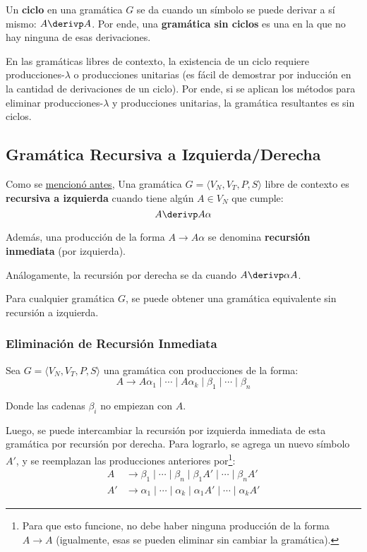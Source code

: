 Un \textbf{ciclo} en una gramática $G$ se da cuando un símbolo se puede derivar a sí mismo: $A \derivp A$. Por ende, una \textbf{gramática sin ciclos} es una en la que no hay ninguna de esas derivaciones.

En las gramáticas libres de contexto, la existencia de un ciclo requiere producciones-$\lambda$ o producciones unitarias (es fácil de demostrar por inducción en la cantidad de derivaciones de un ciclo). Por ende, si se aplican los métodos para eliminar producciones-$\lambda$ y producciones unitarias, la gramática resultantes es sin ciclos.

\subsection{Gramática Recursiva a Izquierda/Derecha}

Como se \hyperref[recursiva-a-izquierda-cota]{mencionó antes}, Una gramática $G = \langle V_N, V_T, P, S \rangle$ libre de contexto es \textbf{recursiva a izquierda} cuando tiene algún $A \in V_N$ que cumple:
$$
    A \derivp A \alpha
$$

Además, una producción de la forma $A \to A \alpha$ se denomina \textbf{recursión inmediata} (por izquierda).

Análogamente, la recursión por derecha se da cuando $A \derivp \alpha A$.

Para cualquier gramática $G$, se puede obtener una gramática equivalente sin recursión a izquierda.

\subsubsection{Eliminación de Recursión Inmediata}

Sea $G = \langle V_N, V_T, P, S \rangle$ una gramática con producciones de la forma:
$$
    A \to A \alpha_1 \mid \cdots \mid A \alpha_k \mid \beta_1 \mid \cdots \mid \beta_n
$$

Donde las cadenas $\beta_i$ no empiezan con $A$.

Luego, se puede intercambiar la recursión por izquierda inmediata de esta gramática por recursión por derecha. Para lograrlo, se agrega un nuevo símbolo $A'$, y se reemplazan las producciones anteriores por\footnote{Para que esto funcione, no debe haber ninguna producción de la forma $A \to A$ (igualmente, esas se pueden eliminar sin cambiar la gramática).}:
$$
\begin{aligned}
    A & \to \beta_1 \mid \cdots \mid \beta_n \mid \beta_1 A' \mid \cdots \mid \beta_n A' \\
    A' & \to \alpha_1 \mid \cdots \mid \alpha_k \mid \alpha_1 A' \mid \cdots \mid \alpha_k A'
\end{aligned}
$$

